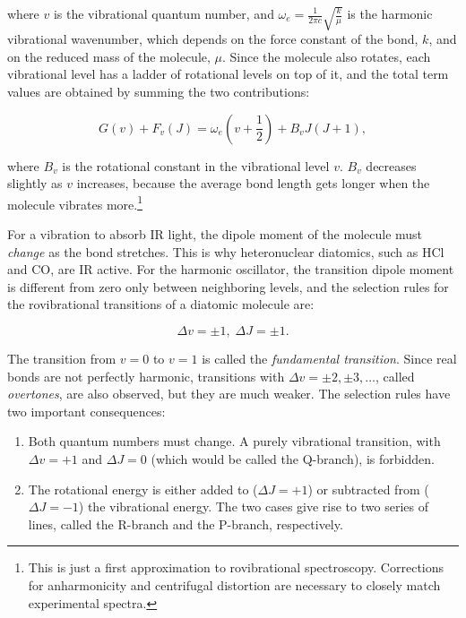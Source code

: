 \documentclass[
  english,
  9pt,
]{extbook}
\providecommand{\tightlist}{%
  \setlength{\itemsep}{0pt}\setlength{\parskip}{0pt}}
\theoremstyle{definition}
\theoremstyle{definition}
\theoremstyle{definition}
\theoremstyle{definition}
\theoremstyle{remark}
\begin{document}
where \(v\) is the vibrational quantum number, and \(\omega_e=\frac{1}{2\pi c}\sqrt{\frac{k}{\mu}}\) is the harmonic vibrational wavenumber, which depends on the force constant of the bond, \(k\), and on the reduced mass of the molecule, \(\mu\). Since the molecule also rotates, each vibrational level has a ladder of rotational levels on top of it, and the total term values are obtained by summing the two contributions:

\begin{equation}
G(v)+F_{v}(J)=\omega_e \left(v + \frac{1}{2} \right) +B_{v}J(J+1),
\label{eq:vib2}
\end{equation}

where \(B_{v}\) is the rotational constant in the vibrational level \(v\). \(B_v\) decreases slightly as \(v\) increases, because the average bond length gets longer when the molecule vibrates more.\footnote{This is just a first approximation to rovibrational spectroscopy. Corrections for anharmonicity and centrifugal distortion are necessary to closely match experimental spectra.}

For a vibration to absorb IR light, the dipole moment of the molecule must \emph{change} as the bond stretches. This is why heteronuclear diatomics, such as \(\mathrm{HCl}\) and \(\mathrm{CO}\), are IR active. For the harmonic oscillator, the transition dipole moment is different from zero only between neighboring levels, and the selection rules for the rovibrational transitions of a diatomic molecule are:

\begin{equation}
\Delta v=\pm 1,\; \Delta J=\pm 1.
\label{eq:vib3}
\end{equation}

The transition from \(v=0\) to \(v=1\) is called the \emph{fundamental transition}. Since real bonds are not perfectly harmonic, transitions with \(\Delta v=\pm 2,\pm 3,\ldots\), called \emph{overtones}, are also observed, but they are much weaker. The selection rules have two important consequences:

\begin{enumerate}
\def\labelenumi{\arabic{enumi}.}
\tightlist
\item
  Both quantum numbers must change. A purely vibrational transition, with \(\Delta v=+1\) and \(\Delta J=0\) (which would be called the Q-branch), is forbidden.
\item
  The rotational energy is either added to (\(\Delta J=+1\)) or subtracted from (\(\Delta J=-1\)) the vibrational energy. The two cases give rise to two series of lines, called the R-branch and the P-branch, respectively.
\end{enumerate}
\end{document}
